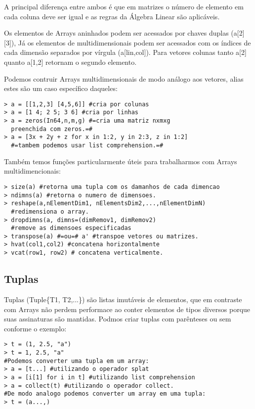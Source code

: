 A principal diferença entre ambos é que em matrizes o número de elemento em cada coluna deve ser igual e as regras da Álgebra Linear são aplicáveis. 


Os elementos de Arrays aninhados podem ser acessados por chaves duplas (a[2][3]), Já os elementos de multidimensionais podem ser acessados com os índices de cada dimensão separados por vírgula (a[lin,col]). Para vetores colunas tanto a[2] quanto a[1,2] retornam o segundo elemento. 

Podemos contruir Arrays multidimensionais de modo análogo aos vetores, alias estes são um caso específico daqueles:
\begin{lstlisting}
> a = [[1,2,3] [4,5,6]] #cria por colunas
> a = [1 4; 2 5; 3 6] #cria por linhas
> a = zeros(In64,n,m,g) #=cria uma matriz nxmxg 
  preenchida com zeros.=#
> a = [3x + 2y + z for x in 1:2, y in 2:3, z in 1:2] 
  #=tambem podemos usar list comprehension.=#
\end{lstlisting}

Também temos funções particularmente úteis para trabalharmos com Arrays multidimencionais:
\begin{lstlisting}
> size(a) #retorna uma tupla com os damanhos de cada dimencao
> ndimns(a) #retorna o numero de dimensoes.
> reshape(a,nElementDim1, nElementsDim2,...,nElementDimN) 
  #redimensiona o array.
> dropdimns(a, dimns=(dimRemov1, dimRemov2) 
  #remove as dimensoes especificadas
> transpose(a) #=ou=# a' #transpoe vetores ou matrizes.
> hvat(col1,col2) #concatena horizontalmente
> vcat(row1, row2) # concatena verticalmente. 
\end{lstlisting}

\subsection{Tuplas}
Tuplas (Tuple\{T1, T2,...\}) são listas imutáveis de elementos, que em contraste com Arrays não perdem performace ao conter elementos de tipos diversos porque suas assinaturas são mantidas. Podmos criar tuplas com parênteses ou sem conforme o exemplo:
\begin{lstlisting}
> t = (1, 2.5, "a")
> t = 1, 2.5, "a"
#Podemos converter uma tupla em um array:
> a = [t...] #utilizando o operador splat
> a = [i[1] for i in t] #utilizando list comprehension
> a = collect(t) #utilizando o operador collect. 
#De modo analogo podemos converter um array em uma tupla:
> t = (a...,)
\end{lstlisting}  

